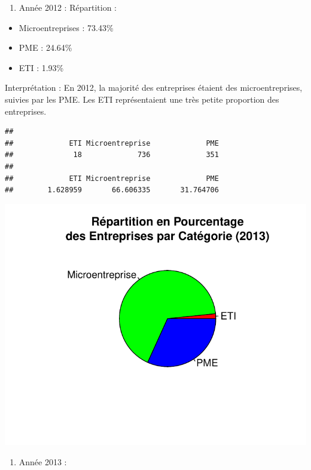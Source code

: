 \documentclass[mstat,12pt]{unswthesis}
\begin{document}
\begin{enumerate}
\def\labelenumi{\arabic{enumi})}
\tightlist
\item
  Année 2012 : Répartition :
\end{enumerate}

\begin{itemize}
\tightlist
\item
  Microentreprises : 73.43\%
\item
  PME : 24.64\%
\item
  ETI : 1.93\%
\end{itemize}

Interprétation : En 2012, la majorité des entreprises étaient des
microentreprises, suivies par les PME. Les ETI représentaient une très
petite proportion des entreprises.

\medskip

\begin{verbatim}
## 
##             ETI Microentreprise             PME 
##              18             736             351 
## 
##             ETI Microentreprise             PME 
##        1.628959       66.606335       31.764706
\end{verbatim}

\includegraphics{TDDT_projet_L_2_files/figure-latex/analyse_univariee_2013-1.pdf}

\medskip

\begin{enumerate}
\def\labelenumi{\arabic{enumi})}
\setcounter{enumi}{1}
\tightlist
\item
  Année 2013 :
\end{enumerate}
\end{document}
